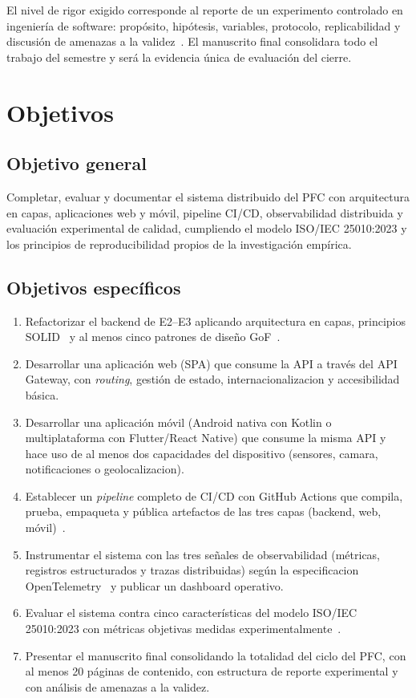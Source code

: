 \documentclass[11pt,a4paper]{article}
\begin{document}
    El nivel de rigor exigido corresponde al reporte de un experimento controlado en ingeniería de software: propósito, hipótesis, variables, protocolo, replicabilidad y discusión de amenazas a la validez~\cite{Wohlin2012Experimentation,Runeson2009CaseStudy}. El manuscrito final consolidara todo el trabajo del semestre y será la evidencia única de evaluación del cierre.

\section{Objetivos}

\subsection{Objetivo general}

    Completar, evaluar y documentar el sistema distribuido del PFC con arquitectura en capas, aplicaciones web y móvil, pipeline CI/CD, observabilidad distribuida y evaluación experimental de calidad, cumpliendo el modelo ISO/IEC 25010:2023 y los principios de reproducibilidad propios de la investigación empírica.

\subsection{Objetivos específicos}

    \begin{enumerate}
        \item Refactorizar el backend de E2--E3 aplicando arquitectura en capas, principios SOLID~\cite{Martin2017CleanArch} y al menos cinco patrones de diseño GoF~\cite{Gamma1994GoF}.
        \item Desarrollar una aplicación web (SPA) que consume la API a través del API Gateway, con \textit{routing}, gestión de estado, internacionalizacion y accesibilidad básica.
        \item Desarrollar una aplicación móvil (Android nativa con Kotlin o multiplataforma con Flutter/React Native) que consume la misma API y hace uso de al menos dos capacidades del dispositivo (sensores, camara, notificaciones o geolocalizacion).
        \item Establecer un \textit{pipeline} completo de CI/CD con GitHub Actions que compila, prueba, empaqueta y pública artefactos de las tres capas (backend, web, móvil)~\cite{Kim2021DevOpsHandbook,Humble2010CD}.
        \item Instrumentar el sistema con las tres señales de observabilidad (métricas, registros estructurados y trazas distribuidas) según la especificacion OpenTelemetry~\cite{OpenTelemetry2024,Sigelman2010Dapper} y publicar un dashboard operativo.
        \item Evaluar el sistema contra cinco características del modelo ISO/IEC 25010:2023 con métricas objetivas medidas experimentalmente~\cite{ISO25010_2023}.
        \item Presentar el manuscrito final consolidando la totalidad del ciclo del PFC, con al menos 20 páginas de contenido, con estructura de reporte experimental y con análisis de amenazas a la validez.
    \end{enumerate}
\end{document}
